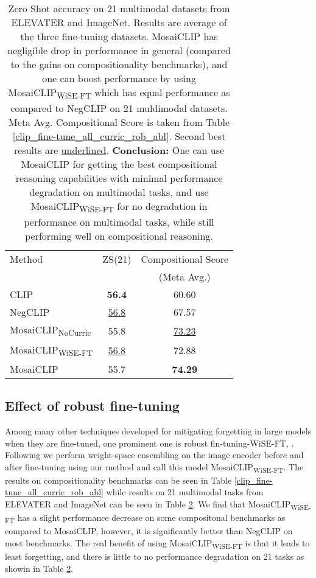 \documentclass[11pt]{article}
\newcommand{\methodcomp}{MosaiCLIP}
\newcommand{\methodcompNoCurric}{MosaiCLIP\textsubscript{NoCurric}}
\newcommand{\methodcompwiseft}{MosaiCLIP\textsubscript{WiSE-FT}}
\newcommand{\clip}{CLIP}
\newcommand{\negclip}{NegCLIP}
\begin{document}
\begin{table}[h!]
\begin{table}[h!]
  \fontsize{10}{10pt}\selectfont
      \centering
      \setlength{\tabcolsep}{2.5pt}
{
        \begin{tabular}{lcc}
        \toprule
        Method & ZS(21) & Compositional Score\\
        & & (Meta Avg.)\\
        \midrule
        \clip{}   & \textbf{56.4} & 60.60\\
        \negclip{}    & \underline{56.8} & 67.57\\
        \methodcompNoCurric{}     & 55.8 & \underline{73.23}\\
        \methodcompwiseft{}   & \underline{56.8} & 72.88\\
        \methodcomp{}     & 55.7 & \textbf{74.29}\\
        \bottomrule
        \end{tabular}
    }
    \caption{Zero Shot accuracy on 21 multimodal datasets from ELEVATER and ImageNet. Results are average of the three fine-tuning datasets. \methodcomp{} has negligible drop in performance in general (compared to the gains on compositionality benchmarks), and one can boost performance by using \methodcompwiseft{} which has equal performance as compared to \negclip{} on 21 muldimodal datasets. Meta Avg. Compositional Score is taken from Table \ref{clip_fine-tune_all_curric_rob_abl}. Second best results are \underline{underlined}. \textbf{Conclusion:} One can use \methodcomp{} for getting the best compositional reasoning capabilities with minimal performance degradation on multimodal tasks, and use \methodcompwiseft{} for no degradation in performance on multimodal tasks, while still performing well on compositional reasoning.}
    \label{ft_zs_21_table}
\end{table}

\subsection{Effect of robust fine-tuning}
\label{robust_ft_effect}
Among many other techniques developed for mitigating forgetting in large models when they are fine-tuned, one prominent one is robust fin-tuning-WiSE-FT, \citep{wortsman2022robust}. Following \citet{wortsman2022robust} we perform weight-space ensembling on the image encoder before and after fine-tuning using our method and call this model \methodcompwiseft{}. The results on compositionality benchmarks can be seen in Table \ref{clip_fine-tune_all_curric_rob_abl} while results on 21 multimodal tasks from ELEVATER and ImageNet can be seen in Table \ref{ft_zs_21_table}. We find that \methodcompwiseft{} has a slight performance decrease on some compositonal benchmarks as compared to \methodcomp{}, however, it is significantly better than \negclip{} on most benchmarks. The real benefit of using \methodcompwiseft{} is that it leads to least forgetting, and there is little to no performance degradation on 21 tasks as showin in Table \ref{ft_zs_21_table}.


\end{table}
\end{document}
